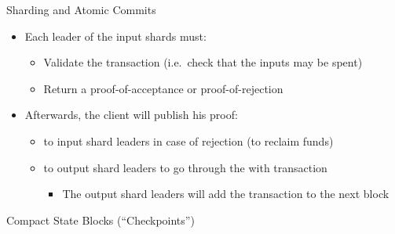 \begin{frame}{Sharding and Atomic Commits}
    \begin{itemize}

        \item Each leader of the input shards must:
            \begin{itemize}
                \item Validate the transaction (i.e.\ check that the inputs may be spent)
                \item Return a \alert{proof-of-acceptance} or \alert{proof-of-rejection}
            \end{itemize}
        \item Afterwards, the client will publish his proof:
            \begin{itemize}
                \item to input shard leaders in case of rejection (to reclaim funds)
                \item to output shard leaders to go through the with transaction
                    \begin{itemize}
                        \item The output shard leaders will add the transaction to the next block
                    \end{itemize}
            \end{itemize}
    \end{itemize}
\end{frame}

\begin{frame}{Compact State Blocks (``Checkpoints'')}
    \centering
\end{frame}

